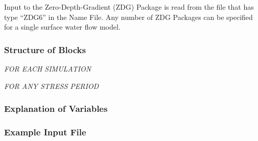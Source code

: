 Input to the Zero-Depth-Gradient (ZDG) Package is read from the file that has type ``ZDG6'' in the Name File.  Any number of ZDG Packages can be specified for a single surface water flow model.

\vspace{5mm}
\subsubsection{Structure of Blocks}
\vspace{5mm}

\noindent \textit{FOR EACH SIMULATION}


\vspace{5mm}
\noindent \textit{FOR ANY STRESS PERIOD}

\packageperioddescription

\vspace{5mm}
\subsubsection{Explanation of Variables}
\begin{description}

\end{description}

\vspace{5mm}
\subsubsection{Example Input File}



